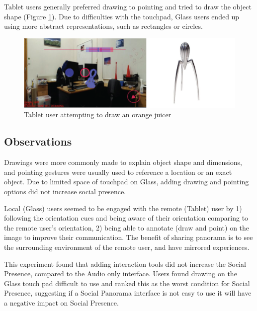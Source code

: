 Tablet users generally preferred drawing to pointing and tried to draw the object shape (Figure \ref{fig:ismar14:tablet-drawing}). Due to difficulties with the touchpad, Glass users ended up using more abstract representations, such as rectangles or circles.

\begin{figure}
    \centering
    \includegraphics[width=\linewidth]{images/63-pano-ismar14/tablet-drawing}
    \caption{Tablet user attempting to draw an orange juicer}
    \label{fig:ismar14:tablet-drawing}
\end{figure}

\subsection{Observations}

Drawings were more commonly made to explain object shape and dimensions, and pointing gestures were usually used to reference a location or an exact object. Due to limited space of touchpad on Glass, adding drawing and pointing options did not increase social presence.

Local (Glass) users seemed to be engaged with the remote (Tablet) user by 1) following the orientation cues and being aware of their orientation comparing to the remote user's orientation, 2) being able to annotate (draw and point) on the image to improve their communication. The benefit of sharing panorama is to see the surrounding environment of the remote user, and have mirrored experiences.

This experiment found that adding interaction tools did not increase the Social Presence, compared to the Audio only interface. Users found drawing on the Glass touch pad difficult to use and ranked this as the worst condition for Social Presence, suggesting if a Social Panorama interface is not easy to use it will have a negative impact on Social Presence. 

